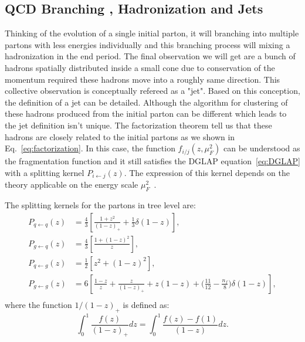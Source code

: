 \subsection{QCD Branching , Hadronization and Jets}
Thinking of the evolution of a single initial parton, it will branching into multiple partons with less energies individually and this branching process will mixing a hadronization in the end period. The final observation we will get are a bunch of hadrons spatially distributed inside a small cone due to conservation of the momentum required these hadrons move into a roughly same direction. This collective observation is conceptually refereed as a "jet". Based on this conception, the definition of a jet can be detailed. Although the algorithm for clustering of these hadrons produced from the initial parton can be different which leads to the jet definition isn't unique. The factorization theorem tell us that these hadrons are closely related to the initial partons as we shown in Eq.~\ref{eq:factorization}. In this case, the function $f_{i/j}(z,\mu^2_F)$ can be understood as the fragmentation function and it still satisfies the DGLAP equation~\ref{eq:DGLAP} with a splitting kernel $P_{i\leftarrow j}(z)$. The expression of this kernel depends on the theory applicable on the energy scale $\mu^2_F$~\cite{Webber:1999ui}.

The splitting kernels for the partons in tree level are:
\begin{equation}
\begin{aligned}
P_{q\leftarrow q} (z) &= \frac{4}{3}\left[\frac{1+z^2}{(1-z)_+}+\frac{1}{3}\delta(1-z)\right],\\
P_{g\leftarrow q} (z) &= \frac{4}{3}\left[\frac{1+(1-z)^2}{z}\right],\\
P_{q\leftarrow g} (z) &= \frac{1}{2}\left[z^2+(1-z)^2\right],\\
P_{g\leftarrow g} (z) &= 6\left[\frac{1-z}{z}+\frac{z}{(1-z)_+}+z(1-z)+\bigg(\frac{11}{12}-\frac{n_f}{8}\bigg)\delta(1-z)\right],\\
\end{aligned}
\end{equation}
where the function $1/(1-z)_+$ is defined as:
\begin{equation}
  \int_0^1\frac{f(z)}{(1-z)_+}dz = \int_0^1\frac{f(z)-f(1)}{(1-z)}dz.
\end{equation}


